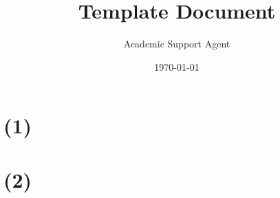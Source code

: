 \documentclass{article}
\title{Template Document}
\author{Academic Support Agent}
\date{\today}
\begin{document}
\maketitle


\section{(1)  }

		 

	 

	 




\section{(2)  }

	 	

	 

\subsection{ }
	 

 



\end{document}
